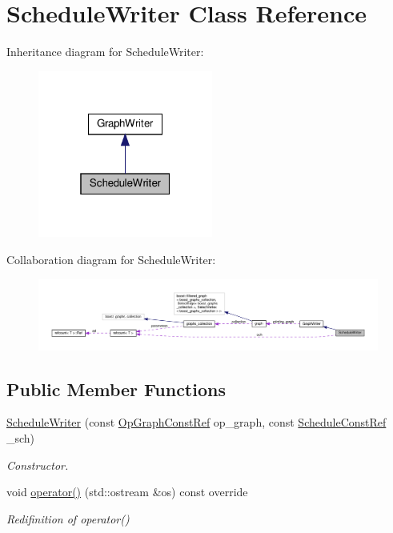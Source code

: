 \hypertarget{classScheduleWriter}{}\section{Schedule\+Writer Class Reference}
\label{classScheduleWriter}


Inheritance diagram for Schedule\+Writer\+:
\nopagebreak
\begin{figure}[H]
\begin{center}
\leavevmode
\includegraphics[width=163pt]{d9/d59/classScheduleWriter__inherit__graph}
\end{center}
\end{figure}


Collaboration diagram for Schedule\+Writer\+:
\nopagebreak
\begin{figure}[H]
\begin{center}
\leavevmode
\includegraphics[width=350pt]{d7/d0c/classScheduleWriter__coll__graph}
\end{center}
\end{figure}
\subsection*{Public Member Functions}
\begin{DoxyCompactItemize}
\item 
\hyperlink{classScheduleWriter_aaca4eeec6e15bab7f1c7e25924422440}{Schedule\+Writer} (const \hyperlink{op__graph_8hpp_a9a0b240622c47584bee6951a6f5de746}{Op\+Graph\+Const\+Ref} op\+\_\+graph, const \hyperlink{schedule_8hpp_a85e4dea8a1611026193d8ca13fc5a260}{Schedule\+Const\+Ref} \+\_\+sch)
\begin{DoxyCompactList}\small\item\em Constructor. \end{DoxyCompactList}\item 
void \hyperlink{classScheduleWriter_a31d2744418a5d0fa5fa1ac01acde3052}{operator()} (std\+::ostream \&os) const override
\begin{DoxyCompactList}\small\item\em Redifinition of operator() \end{DoxyCompactList}\end{DoxyCompactItemize}
